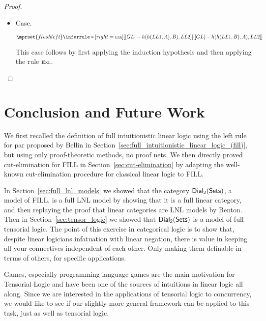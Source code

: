 \begin{proof}
\begin{report}
\begin{itemize}
  \item[] Case.\\ 
    \begin{center}
      \begin{math}
        $$\mprset{flushleft}
        \inferrule* [right=\ifrName{Exr}] {
          [[GL |- h(h(LL1 , A) , B) , LL2]]
        }{[[GL |- h(h(LL1 , B) , A) , LL2]]}
      \end{math}
    \end{center}
    This case follows by first applying the induction hypothesis and then applying
    the rule $\scriptsize \textsc{Exl}$.  
  \end{itemize}
  \end{report}
\end{proof}



\section{Conclusion and Future Work}
\label{sec:conclusion_and_future_work}

We first recalled the definition of full intuitionistic linear logic
using the left rule for par proposed by Bellin in
Section~\ref{sec:full_intuitionistic_linear_logic_(fill)}, but using
only proof-theoretic methods, no proof nets.  We then directly proved
cut-elimination for FILL in Section~\ref{sec:cut-elimination} by
adapting the well-known cut-elimination procedure for classical linear
logic to FILL.

In Section~\ref{sec:full_lnl_models} we showed that the category
$\mathsf{Dial_2}(\mathsf{Sets})$, a model of FILL, is a full LNL model by showing that it is a
full linear category, and then replaying the proof that linear
categories are LNL models by Benton. Then in
Section~\ref{sec:tensor_logic} we showed that $\mathsf{Dial_2}(\mathsf{Sets})$ is a model of
full tensorial logic. The point of this exercise in categorical logic
is to show that, despite linear logicians infatuation with linear
negation, there is value in keeping all your connectives independent
of each other. Only making them definable in terms of others, for
specific applications.

Games, especially programming language games are the main motivation
for Tensorial Logic and have been one of the sources of intuitions in
linear logic all along. Since we are interested in the applications of
tensorial logic to concurrency, we would like to see if our slightly
more general framework can be applied to this task, just as well as
tensorial logic.

